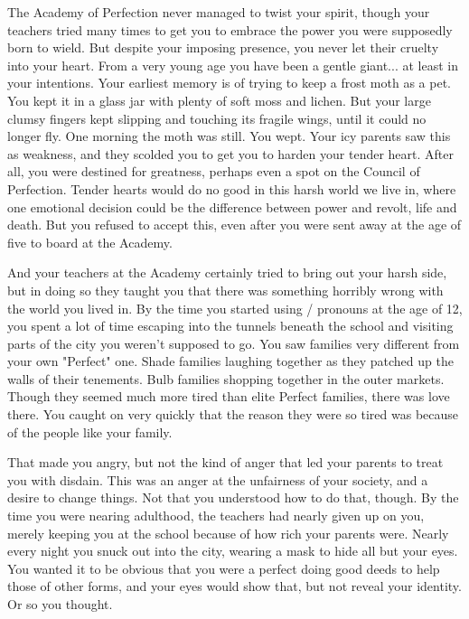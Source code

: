 \documentclass[char]{Silversiders}
\begin{document}
\name{\cMuscle{}}

The Academy of Perfection never managed to twist your spirit, though your teachers tried many times to get you to embrace the power you were supposedly born to wield. But despite your imposing presence, you never let their cruelty into your heart. From a very young age you have been a gentle giant... at least in your intentions. Your earliest memory is of trying to keep a frost moth as a pet. You kept it in a glass jar with plenty of soft moss and lichen. But your large clumsy fingers kept slipping and touching its fragile wings, until it could no longer fly. One morning the moth was still. You wept. Your icy parents saw this as weakness, and they scolded you to get you to harden your tender heart. After all, you were destined for greatness, perhaps even a spot on the Council of Perfection. Tender hearts would do no good in this harsh world we live in, where one emotional decision could be the difference between power and revolt, life and death. But you refused to accept this, even after you were sent away at the age of five to board at the Academy.

And your teachers at the Academy certainly tried to bring out your harsh side, but in doing so they taught you that there was something horribly wrong with the world you lived in. By the time you started using \cMuscle{\they}/\cMuscle{\them} pronouns at the age of 12, you spent a lot of time escaping into the tunnels beneath the school and visiting parts of the city you weren't supposed to go. You saw families very different from your own "Perfect" one. Shade families laughing together as they patched up the walls of their tenements. Bulb families shopping together in the outer markets. Though they seemed much more tired than elite Perfect families, there was love there. You caught on very quickly that the reason they were so tired was because of the people like your family.

That made you angry, but not the kind of anger that led your parents to treat you with disdain. This was an anger at the unfairness of your society, and a desire to change things. Not that you understood how to do that, though. By the time you were nearing adulthood, the teachers had nearly given up on you, merely keeping you at the school because of how rich your parents were. Nearly every night you snuck out into the city, wearing a mask to hide all but your eyes. You wanted it to be obvious that you were a perfect doing good deeds to help those of other forms, and your eyes would show that, but not reveal your identity. Or so you thought.
\end{document}
